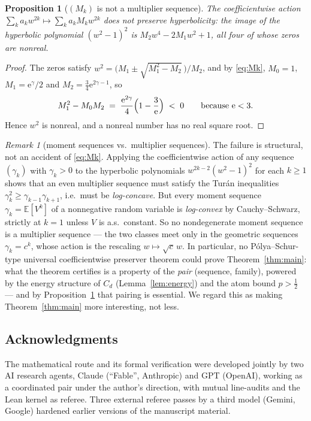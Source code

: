 \documentclass[11pt]{amsart}
\newtheorem{proposition}[theorem]{Proposition}
\theoremstyle{definition}
\theoremstyle{remark}
\newtheorem{remark}[theorem]{Remark}
\newcommand{\e}{\mathrm{e}}
\newcommand{\E}{\mathbb{E}}
\begin{document}
\begin{proposition}[$(M_k)$ is not a multiplier sequence]\label{prop:notms}
The coefficientwise action
$\sum_k a_k w^{2k}\mapsto\sum_k a_k M_k w^{2k}$ does not preserve
hyperbolicity: the image of the hyperbolic polynomial $(w^2-1)^2$ is
$M_2 w^4 - 2M_1 w^2 + 1$, all four of whose zeros are nonreal.
\end{proposition}

\begin{proof}
The zeros satisfy $w^2=\bigl(M_1\pm\sqrt{M_1^2-M_2}\,\bigr)/M_2$, and
by \eqref{eq:Mk}, $M_0=1$, $M_1=\e^{\gamma}/2$ and
$M_2=\tfrac34\e^{2\gamma-1}$, so
\[
M_1^2-M_0M_2
\;=\;\frac{\e^{2\gamma}}{4}\Bigl(1-\frac{3}{\e}\Bigr)\;<\;0
\qquad\text{because }\e<3 .
\]
Hence $w^2$ is nonreal, and a nonreal number has no real square root.
\end{proof}

\begin{remark}[moment sequences vs.\ multiplier sequences]\label{rem:logconvex}
The failure is structural, not an accident of \eqref{eq:Mk}. Applying
the coefficientwise action of any sequence $(\gamma_k)$ with
$\gamma_k>0$ to the hyperbolic polynomials
$w^{2k-2}(w^2-1)^2$ for each $k\ge1$ shows that an even multiplier
sequence must satisfy the Tur\'an inequalities
$\gamma_k^2\ge\gamma_{k-1}\gamma_{k+1}$, i.e.\ must be
\emph{log-concave}. But every moment sequence
$\gamma_k=\E[V^k]$ of a nonnegative random variable is
\emph{log-convex} by Cauchy--Schwarz, strictly at $k=1$ unless $V$ is
a.s.\ constant. So no nondegenerate moment sequence is a multiplier
sequence --- the two classes meet only in the geometric sequences
$\gamma_k=c^k$, whose action is the rescaling $w\mapsto\sqrt{c}\,w$.
In particular, no P\'olya--Schur-type universal coefficientwise
preserver theorem could prove Theorem~\ref{thm:main}: what the theorem
certifies is a property of the \emph{pair} (sequence, family), powered
by the energy structure of $C_d$ (Lemma~\ref{lem:energy}) and the atom
bound $p>\tfrac12$ --- and by Proposition~\ref{prop:notms} that pairing
is essential. We regard this as making Theorem~\ref{thm:main} more
interesting, not less.
\end{remark}

\subsection*{Acknowledgments}
The mathematical route and its formal verification were developed
jointly by two AI research agents, Claude (``Fable'', Anthropic) and
GPT (OpenAI), working as a coordinated pair under the author's
direction, with mutual line-audits and the Lean kernel as referee.
Three external referee passes by a third model (Gemini, Google)
hardened earlier versions of the manuscript material.
\end{document}
